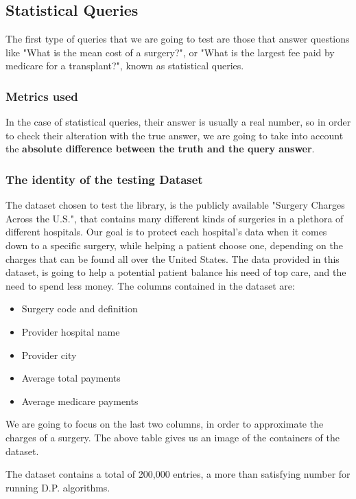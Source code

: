 \subsection{Statistical Queries}

The first type of queries that we are going to test are those that answer questions like "What is the mean cost of a surgery?", or "What is the largest fee paid by medicare for a transplant?", known as statistical queries. 

\subsubsection{Metrics used}

In the case of statistical queries, their answer is usually a real number, so in order to check their alteration with the true answer, we are going to take into account the \textbf{absolute difference between the truth and the query answer}. 

\subsubsection{The identity of the testing Dataset}

The dataset chosen to test the library, is the publicly available "Surgery Charges Across the U.S.", that contains many different kinds of surgeries in a plethora of different hospitals. Our goal is to protect each hospital's data when it comes down to a specific surgery, while helping a patient choose one, depending on the charges that can be found all over the United States. The data provided in this dataset, is going to help a potential patient balance his need of top care, and the need to spend less money. The columns contained in the dataset are:

\begin{itemize}
    \item Surgery code and definition
    \item Provider hospital name
    \item Provider city
    \item Average total payments
    \item Average medicare payments
\end{itemize}

We are going to focus on the last two columns, in order to approximate the charges of a surgery. The above table gives us an image of the containers of the dataset.

The dataset contains a total of 200,000 entries, a more than satisfying number for running D.P. algorithms.

